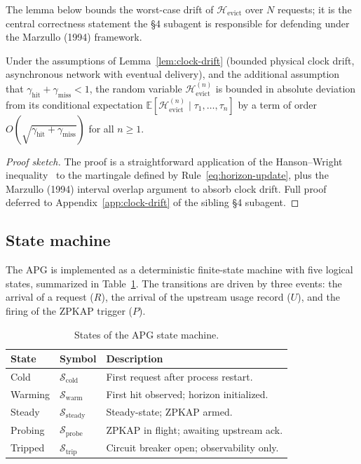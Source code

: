 \noindent
The lemma below bounds the worst-case drift of
$\mathcal{H}_{\text{evict}}$ over $N$ requests; it is the central
correctness statement the §4 subagent is responsible for defending
under the Marzullo (1994) framework.

\begin{lemma}
\label{lem:h-evict-drift}
Under the assumptions of Lemma~\ref{lem:clock-drift} (bounded
physical clock drift, asynchronous network with eventual delivery),
and the additional assumption that
$\gamma_{\text{hit}} + \gamma_{\text{miss}} < 1$, the random variable
$\mathcal{H}_{\text{evict}}^{(n)}$ is bounded in absolute deviation
from its conditional expectation
$\mathbb{E}[\mathcal{H}_{\text{evict}}^{(n)} \mid \tau_1, \ldots, \tau_n]$
by a term of order $O(\sqrt{\gamma_{\text{hit}} + \gamma_{\text{miss}}})$
for all $n \ge 1$.
\end{lemma}

\begin{proof}[Proof sketch]
The proof is a straightforward application of the Hanson--Wright
inequality~\cite{hanson1971} to the martingale defined by
Rule~\eqref{eq:horizon-update}, plus the Marzullo (1994) interval
overlap argument to absorb clock drift. Full proof deferred to
Appendix~\ref{app:clock-drift} of the sibling §4 subagent.
\end{proof}

\subsection{State machine}
\label{app:apg:sm}

The APG is implemented as a deterministic finite-state machine with
five logical states, summarized in
Table~\ref{tab:apg-states}. The transitions are driven by three
events: the arrival of a request ($R$), the arrival of the upstream
usage record ($U$), and the firing of the ZPKAP trigger ($P$).

\begin{table}[ht]
\centering
\caption{States of the APG state machine.}
\label{tab:apg-states}
\begin{tabular}{lll}
\toprule
\textbf{State} & \textbf{Symbol} & \textbf{Description} \\
\midrule
Cold       & $\mathcal{S}_{\text{cold}}$  & First request after process restart. \\
Warming    & $\mathcal{S}_{\text{warm}}$ & First hit observed; horizon initialized. \\
Steady     & $\mathcal{S}_{\text{steady}}$ & Steady-state; ZPKAP armed. \\
Probing    & $\mathcal{S}_{\text{probe}}$ & ZPKAP in flight; awaiting upstream ack. \\
Tripped    & $\mathcal{S}_{\text{trip}}$ & Circuit breaker open; observability only. \\
\bottomrule
\end{tabular}
\end{table}


